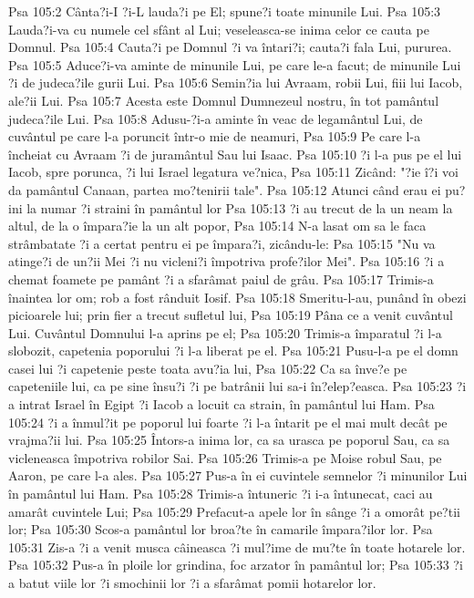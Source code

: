 Psa 105:2  Cânta?i-I ?i-L lauda?i pe El; spune?i toate minunile Lui.
Psa 105:3  Lauda?i-va cu numele cel sfânt al Lui; veseleasca-se inima celor ce cauta pe Domnul.
Psa 105:4  Cauta?i pe Domnul ?i va întari?i; cauta?i fala Lui, pururea.
Psa 105:5  Aduce?i-va aminte de minunile Lui, pe care le-a facut; de minunile Lui ?i de judeca?ile gurii Lui.
Psa 105:6  Semin?ia lui Avraam, robii Lui, fiii lui Iacob, ale?ii Lui.
Psa 105:7  Acesta este Domnul Dumnezeul nostru, în tot pamântul judeca?ile Lui.
Psa 105:8  Adusu-?i-a aminte în veac de legamântul Lui, de cuvântul pe care l-a poruncit într-o mie de neamuri,
Psa 105:9  Pe care l-a încheiat cu Avraam ?i de juramântul Sau lui Isaac.
Psa 105:10  ?i l-a pus pe el lui Iacob, spre porunca, ?i lui Israel legatura ve?nica,
Psa 105:11  Zicând: "?ie î?i voi da pamântul Canaan, partea mo?tenirii tale".
Psa 105:12  Atunci când erau ei pu?ini la numar ?i straini în pamântul lor
Psa 105:13  ?i au trecut de la un neam la altul, de la o împara?ie la un alt popor,
Psa 105:14  N-a lasat om sa le faca strâmbatate ?i a certat pentru ei pe împara?i, zicându-le:
Psa 105:15  "Nu va atinge?i de un?ii Mei ?i nu vicleni?i împotriva profe?ilor Mei".
Psa 105:16  ?i a chemat foamete pe pamânt ?i a sfarâmat paiul de grâu.
Psa 105:17  Trimis-a înaintea lor om; rob a fost rânduit Iosif.
Psa 105:18  Smeritu-l-au, punând în obezi picioarele lui; prin fier a trecut sufletul lui,
Psa 105:19  Pâna ce a venit cuvântul Lui. Cuvântul Domnului l-a aprins pe el;
Psa 105:20  Trimis-a împaratul ?i l-a slobozit, capetenia poporului ?i l-a liberat pe el.
Psa 105:21  Pusu-l-a pe el domn casei lui ?i capetenie peste toata avu?ia lui,
Psa 105:22  Ca sa înve?e pe capeteniile lui, ca pe sine însu?i ?i pe batrânii lui sa-i în?elep?easca.
Psa 105:23  ?i a intrat Israel în Egipt ?i Iacob a locuit ca strain, în pamântul lui Ham.
Psa 105:24  ?i a înmul?it pe poporul lui foarte ?i l-a întarit pe el mai mult decât pe vrajma?ii lui.
Psa 105:25  Întors-a inima lor, ca sa urasca pe poporul Sau, ca sa vicleneasca împotriva robilor Sai.
Psa 105:26  Trimis-a pe Moise robul Sau, pe Aaron, pe care l-a ales.
Psa 105:27  Pus-a în ei cuvintele semnelor ?i minunilor Lui în pamântul lui Ham.
Psa 105:28  Trimis-a întuneric ?i i-a întunecat, caci au amarât cuvintele Lui;
Psa 105:29  Prefacut-a apele lor în sânge ?i a omorât pe?tii lor;
Psa 105:30  Scos-a pamântul lor broa?te în camarile împara?ilor lor.
Psa 105:31  Zis-a ?i a venit musca câineasca ?i mul?ime de mu?te în toate hotarele lor.
Psa 105:32  Pus-a în ploile lor grindina, foc arzator în pamântul lor;
Psa 105:33  ?i a batut viile lor ?i smochinii lor ?i a sfarâmat pomii hotarelor lor.
